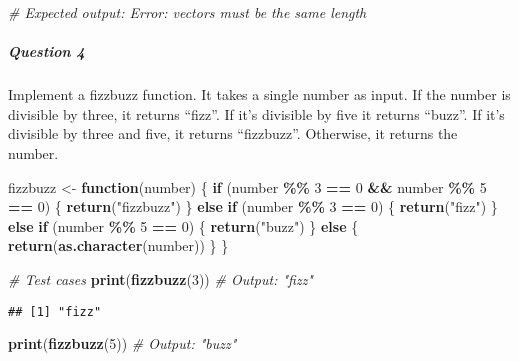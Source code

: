 \documentclass[
]{article}
\newenvironment{Shaded}{\begin{snugshade}}{\end{snugshade}}
\newcommand{\CommentTok}[1]{\textcolor[rgb]{0.56,0.35,0.01}{\textit{#1}}}
\newcommand{\ControlFlowTok}[1]{\textcolor[rgb]{0.13,0.29,0.53}{\textbf{#1}}}
\newcommand{\DecValTok}[1]{\textcolor[rgb]{0.00,0.00,0.81}{#1}}
\newcommand{\FunctionTok}[1]{\textcolor[rgb]{0.13,0.29,0.53}{\textbf{#1}}}
\newcommand{\NormalTok}[1]{#1}
\newcommand{\OtherTok}[1]{\textcolor[rgb]{0.56,0.35,0.01}{#1}}
\newcommand{\SpecialCharTok}[1]{\textcolor[rgb]{0.81,0.36,0.00}{\textbf{#1}}}
\newcommand{\StringTok}[1]{\textcolor[rgb]{0.31,0.60,0.02}{#1}}
\begin{document}
\begin{Shaded}
\begin{Highlighting}[]
\CommentTok{\# Expected output: Error: vectors must be the same length}
\end{Highlighting}
\end{Shaded}

\hypertarget{question-4}{%
\subparagraph{Question 4}\label{question-4}}

Implement a fizzbuzz function. It takes a single number as input. If the
number is divisible by three, it returns ``fizz''. If it's divisible by
five it returns ``buzz''. If it's divisible by three and five, it
returns ``fizzbuzz''. Otherwise, it returns the number.

\begin{Shaded}
\begin{Highlighting}[]
\NormalTok{fizzbuzz }\OtherTok{\textless{}{-}} \ControlFlowTok{function}\NormalTok{(number) \{}
  \ControlFlowTok{if}\NormalTok{ (number }\SpecialCharTok{\%\%} \DecValTok{3} \SpecialCharTok{==} \DecValTok{0} \SpecialCharTok{\&\&}\NormalTok{ number }\SpecialCharTok{\%\%} \DecValTok{5} \SpecialCharTok{==} \DecValTok{0}\NormalTok{) \{}
    \FunctionTok{return}\NormalTok{(}\StringTok{"fizzbuzz"}\NormalTok{)}
\NormalTok{  \} }\ControlFlowTok{else} \ControlFlowTok{if}\NormalTok{ (number }\SpecialCharTok{\%\%} \DecValTok{3} \SpecialCharTok{==} \DecValTok{0}\NormalTok{) \{}
    \FunctionTok{return}\NormalTok{(}\StringTok{"fizz"}\NormalTok{)}
\NormalTok{  \} }\ControlFlowTok{else} \ControlFlowTok{if}\NormalTok{ (number }\SpecialCharTok{\%\%} \DecValTok{5} \SpecialCharTok{==} \DecValTok{0}\NormalTok{) \{}
    \FunctionTok{return}\NormalTok{(}\StringTok{"buzz"}\NormalTok{)}
\NormalTok{  \} }\ControlFlowTok{else}\NormalTok{ \{}
    \FunctionTok{return}\NormalTok{(}\FunctionTok{as.character}\NormalTok{(number))}
\NormalTok{  \}}
\NormalTok{\}}

\CommentTok{\# Test cases}
\FunctionTok{print}\NormalTok{(}\FunctionTok{fizzbuzz}\NormalTok{(}\DecValTok{3}\NormalTok{))    }\CommentTok{\# Output: "fizz"}
\end{Highlighting}
\end{Shaded}

\begin{verbatim}
## [1] "fizz"
\end{verbatim}

\begin{Shaded}
\begin{Highlighting}[]
\FunctionTok{print}\NormalTok{(}\FunctionTok{fizzbuzz}\NormalTok{(}\DecValTok{5}\NormalTok{))    }\CommentTok{\# Output: "buzz"}
\end{Highlighting}
\end{Shaded}
\end{document}
